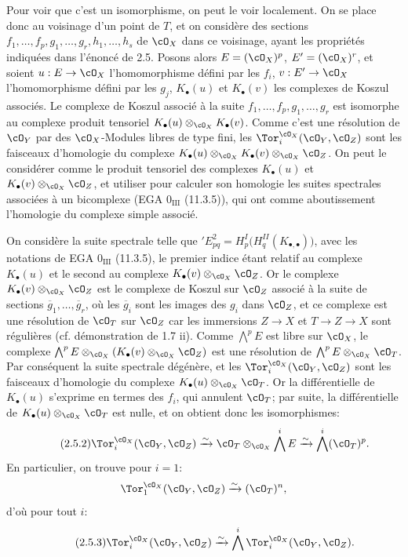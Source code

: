 Pour voir que c'est un isomorphisme, on peut le voir localement. On se place donc au voisinage d'un point de \(T\), et on considère des sections \(f_1,\ldots,f_p,g_1,\ldots,g_r,h_1,\ldots,h_s\) de \(\cO_X\) dans ce voisinage, ayant les propriétés indiquées dans l'énoncé de 2.5. Posons alors \(E=(\cO_X)^p\), \(E'=(\cO_X)^r\), et soient \(u:E\to\cO_X\) l'homomorphisme défini par les \(f_i\), \(v:E'\to\cO_X\) l'homomorphisme défini par les \(g_j\), \(K_\bullet(u)\) et \(K_\bullet(v)\) les
complexes de Koszul associés. Le complexe de Koszul associé à la suite \(f_1,\ldots,f_p,g_1,\ldots,g_r\) est isomorphe au complexe produit tensoriel \(K_\bullet(u)\otimes_{\cO_X}K_\bullet(v)\). Comme c'est une résolution de \(\cO_Y\) par des \(\cO_X\)-Modules libres de type fini, les \(\Tor_i^{\cO_X}(\cO_Y,\cO_Z)\) sont les faisceaux d'homologie du complexe \(K_\bullet(u)\otimes_{\cO_X}K_\bullet(v)\otimes_{\cO_X}\cO_Z\). On peut le considérer comme le produit tensoriel des complexes \(K_\bullet(u)\) et \(K_\bullet(v)\otimes_{\cO_X}\cO_Z\), et utiliser pour calculer son homologie les suites spectrales associées à un bicomplexe (EGA \(0_{\mathrm{III}}\) (11.3.5)), qui ont comme aboutissement l'homologie du complexe simple associé.

On considère la suite spectrale telle que \({}'E^2_{pq}=H^I_p\bigl(H^{II}_q(K_{\bullet,\bullet})\bigr)\), avec les notations de EGA \(0_{\mathrm{III}}\) (11.3.5), le premier indice étant relatif au complexe \(K_\bullet(u)\) et le second au complexe \(K_\bullet(v)\otimes_{\cO_X}\cO_Z\). Or le complexe \(K_\bullet(v)\otimes_{\cO_X}\cO_Z\) est le complexe de Koszul sur \(\cO_Z\) associé à la suite de sections \(\overline g_1,\ldots,\overline g_r\), où les \(\overline g_i\) sont les images des \(g_i\) dans \(\cO_Z\), et ce complexe est une résolution de \(\cO_T\) sur \(\cO_Z\) car les immersions \(Z\to X\) et \(T\to Z\to X\) sont régulières (cf. démonstration de 1.7 ii). Comme \(\bigwedge^p E\) est libre sur \(\cO_X\), le complexe \(\bigwedge^pE\otimes_{\cO_X}(K_\bullet(v)\otimes_{\cO_X}\cO_Z)\) est une résolution de \(\bigwedge^pE\otimes_{\cO_X}\cO_T\). Par conséquent la suite spectrale dégénère, et les \(\Tor_i^{\cO_X}(\cO_Y,\cO_Z)\) sont les faisceaux d'homologie du complexe \(K_\bullet(u)\otimes_{\cO_X}\cO_T\). Or la différentielle de \(K_\bullet(u)\) s'exprime en termes des \(f_i\), qui annulent \(\cO_T\); par suite, la différentielle de \(K_\bullet(u)\otimes_{\cO_X}\cO_T\) est nulle, et on obtient donc les isomorphismes:
\begin{equation}\tag{2.5.2}
\Tor_i^{\cO_X}(\cO_Y,\cO_Z)
\xrightarrow{\sim}
\cO_T\otimes_{\cO_X}\bigwedge^iE
\xrightarrow{\sim}
\bigwedge^i(\cO_T)^p.
\end{equation}
En particulier, on trouve pour \(i=1\):
\[
\Tor_1^{\cO_X}(\cO_Y,\cO_Z)\xrightarrow{\sim}(\cO_T)^n,
\]
d'où pour tout \(i\):
\begin{equation}\tag{2.5.3}
\Tor_i^{\cO_X}(\cO_Y,\cO_Z)
\xrightarrow{\sim}
\bigwedge^i\Tor_i^{\cO_X}(\cO_Y,\cO_Z).
\end{equation}

